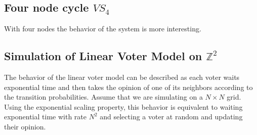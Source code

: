 \documentclass{article}
\theoremstyle{plain}
\theoremstyle{definition}
\theoremstyle{remark}
\numberwithin{equation}{section}
\newcommand{\Z}{\mathbb{Z}}
\begin{document}
\subsection{Four node cycle \texorpdfstring{$VS_4$}{VS4}}
With four nodes the behavior of the system is more interesting.


\subsection{Simulation of Linear Voter Model on \texorpdfstring{$\Z^2$}{Z2}}

The behavior of the linear voter model can be described as each voter waits exponential time and then takes the opinion of one of its neighbors according to the transition probabilities.
Assume that we are simulating on a $N \times N$ grid.
Using the exponential scaling property, this behavior is equivalent to waiting exponential time with rate $N^2$ and selecting a voter at random and updating their opinion.

\clearpage


\end{document}
